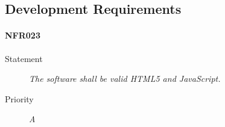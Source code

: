 \subsection{Development Requirements}

\paragraph{NFR023}
\begin{description}
\item [Statement] \textit{The software shall be valid \gls{HTML5} and
    \gls{JavaScript}.}
\item [Priority] \textit{A}
\end{description}